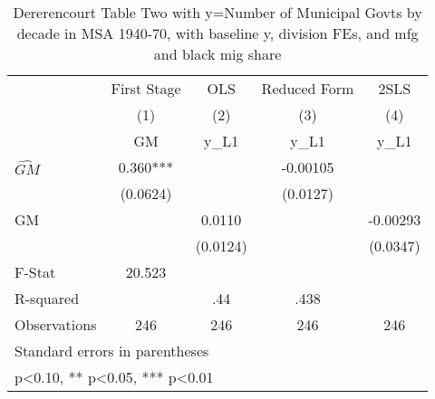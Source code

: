 \begin{table}[htbp]\centering
\def\sym#1{\ifmmode^{#1}\else\(^{#1}\)\fi}
\caption{Dererencourt Table Two with y=Number of Municipal Govts by decade in MSA 1940-70, with baseline y, division FEs, and mfg and black mig share}
\begin{tabular}{l*{4}{c}}
\toprule
                    & First Stage   &         OLS   &Reduced Form   &        2SLS   \\
                    &\multicolumn{1}{c}{(1)}&\multicolumn{1}{c}{(2)}&\multicolumn{1}{c}{(3)}&\multicolumn{1}{c}{(4)}\\
                    &\multicolumn{1}{c}{GM}&\multicolumn{1}{c}{y\_L1}&\multicolumn{1}{c}{y\_L1}&\multicolumn{1}{c}{y\_L1}\\
\midrule
$\hat{GM}$          &       0.360***&               &    -0.00105   &               \\
                    &    (0.0624)   &               &    (0.0127)   &               \\
\addlinespace
GM                  &               &      0.0110   &               &    -0.00293   \\
                    &               &    (0.0124)   &               &    (0.0347)   \\
\midrule
F-Stat              &      20.523   &               &               &               \\
R-squared           &               &         .44   &        .438   &               \\
Observations        &         246   &         246   &         246   &         246   \\
\bottomrule
\multicolumn{5}{l}{\footnotesize Standard errors in parentheses}\\
\multicolumn{5}{l}{\footnotesize * p<0.10, ** p<0.05, *** p<0.01}\\
\end{tabular}
\end{table}

